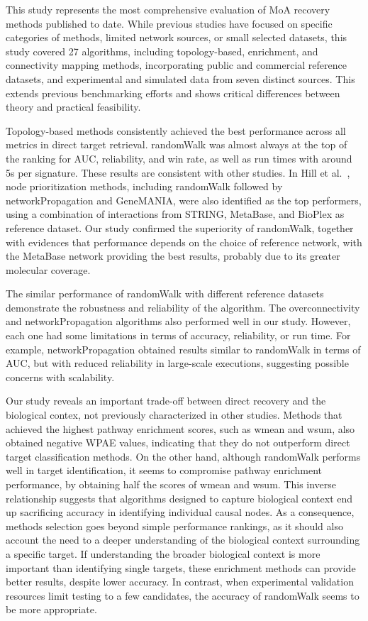 This study represents the most comprehensive evaluation of MoA recovery methods published to date. While previous studies have focused on specific categories of methods, limited network sources, or small selected datasets, this study covered 27 algorithms, including topology-based, enrichment, and connectivity mapping methods, incorporating public and commercial reference datasets, and experimental and simulated data from seven distinct sources. This extends previous benchmarking efforts and shows critical differences between theory and practical feasibility.

Topology-based methods consistently achieved the best performance across all metrics in direct target retrieval. randomWalk was almost always at the top of the ranking for AUC, reliability, and win rate, as well as run times with around 5s per signature. These results are consistent with other studies. In Hill et al.~\cite{RN37}, node prioritization methods, including randomWalk followed by networkPropagation and GeneMANIA, were also identified as the top performers, using a  combination of interactions from STRING, MetaBase, and BioPlex as reference dataset. Our study confirmed the superiority of randomWalk, together with evidences that performance depends on the choice of reference network, with the MetaBase network providing the best results, probably due to its greater molecular coverage.

The similar performance of randomWalk with different reference datasets demonstrate the robustness and reliability of the algorithm. The overconnectivity and networkPropagation algorithms also performed well in our study. However, each one had some limitations in terms of accuracy, reliability, or run time. For example, networkPropagation obtained results similar to randomWalk in terms of AUC, but with reduced reliability in large-scale executions, suggesting possible concerns with scalability.

Our study reveals an important trade-off between direct recovery and the biological contex, not previously characterized in other studies. Methods that achieved the highest pathway enrichment scores, such as wmean and wsum, also obtained negative WPAE values, indicating that they do not outperform direct target classification methods. On the other hand, although randomWalk performs well in target identification, it seems to compromise pathway enrichment performance, by obtaining half the scores of wmean and wsum. This inverse relationship suggests that algorithms designed to capture biological context end up sacrificing accuracy in identifying individual causal nodes. As a consequence, methods selection goes beyond simple performance rankings, as it should also account the need to a deeper understanding of the biological context surrounding a specific target. If understanding the broader biological context is more important than identifying single targets, these enrichment methods can provide better results, despite lower accuracy. In contrast, when experimental validation resources limit testing to a few candidates, the accuracy of randomWalk seems to be more appropriate.

